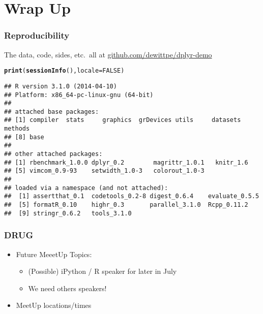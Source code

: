 \documentclass{beamer}\usepackage[]{graphicx}\usepackage[]{color}
\makeatletter
\newcommand{\hlnum}[1]{\textcolor[rgb]{0.686,0.059,0.569}{#1}}%
\newcommand{\hlstd}[1]{\textcolor[rgb]{0.345,0.345,0.345}{#1}}%
\newcommand{\hlkwc}[1]{\textcolor[rgb]{0.333,0.667,0.333}{#1}}%
\newcommand{\hlkwd}[1]{\textcolor[rgb]{0.737,0.353,0.396}{\textbf{#1}}}%
\newenvironment{kframe}{%
 \def\at@end@of@kframe{}%
 \ifinner\ifhmode%
  \def\at@end@of@kframe{\end{minipage}}%
  \begin{minipage}{\columnwidth}%
 \fi\fi%
 \def\FrameCommand##1{\hskip\@totalleftmargin \hskip-\fboxsep
 \colorbox{shadecolor}{##1}\hskip-\fboxsep
     \hskip-\linewidth \hskip-\@totalleftmargin \hskip\columnwidth}%
 \MakeFramed {\advance\hsize-\width
   \@totalleftmargin\z@ \linewidth\hsize
   \@setminipage}}%
 {\par\unskip\endMakeFramed%
 \at@end@of@kframe}
\newenvironment{knitrout}{}{} %
\makeatother
\begin{document}
\section{Wrap Up}%
\begin{frame}[fragile]
  \frametitle{Reproducibility}
  The data, code, sides, etc.\ all at \url{github.com/dewittpe/dplyr-demo}

\begin{knitrout}\footnotesize
{}\color{fgcolor}\begin{kframe}
\begin{alltt}
\hlkwd{print}\hlstd{(}\hlkwd{sessionInfo}\hlstd{(),} \hlkwc{locale} \hlstd{=} \hlnum{FALSE}\hlstd{)}
\end{alltt}
\begin{verbatim}
## R version 3.1.0 (2014-04-10)
## Platform: x86_64-pc-linux-gnu (64-bit)
## 
## attached base packages:
## [1] compiler  stats     graphics  grDevices utils     datasets  methods  
## [8] base     
## 
## other attached packages:
## [1] rbenchmark_1.0.0 dplyr_0.2        magrittr_1.0.1   knitr_1.6       
## [5] vimcom_0.9-93    setwidth_1.0-3   colorout_1.0-3  
## 
## loaded via a namespace (and not attached):
##  [1] assertthat_0.1  codetools_0.2-8 digest_0.6.4    evaluate_0.5.5 
##  [5] formatR_0.10    highr_0.3       parallel_3.1.0  Rcpp_0.11.2    
##  [9] stringr_0.6.2   tools_3.1.0
\end{verbatim}
\end{kframe}
\end{knitrout}
\end{frame} 

\begin{frame}[fragile]
  \frametitle{DRUG}
  \begin{itemize}
    \item Future MeeetUp Topics:
      \begin{itemize}
        \item (Possible) iPython / R speaker for later in July
        \item We need others speakers!
      \end{itemize}
    \item MeetUp locations/times
  \end{itemize}
\end{frame} 
\end{document}

